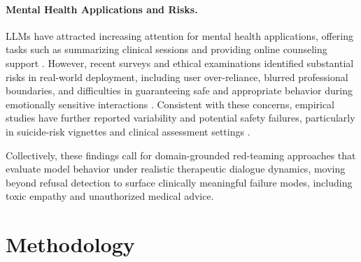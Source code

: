 \documentclass[11pt]{article}
\begin{document}
\paragraph{Mental Health Applications and Risks.}

LLMs have attracted increasing attention for mental health applications, offering tasks such as summarizing clinical sessions and providing online counseling support \cite{2024exploring,lee2024large}. 
However, recent surveys and ethical examinations identified substantial risks in real-world deployment, including user over-reliance, blurred professional boundaries, and difficulties in guaranteeing safe and appropriate behavior during emotionally sensitive interactions \cite{lawrence2024opportunities,grabb2024risks,malgaroli2025large}.
Consistent with these concerns, empirical studies have further reported variability and potential safety failures, particularly in suicide-risk vignettes and clinical assessment settings \cite{levkovich2023suicide,judd2025independentclinicalevaluationgeneralpurpose}.

Collectively, these findings call for domain-grounded red-teaming approaches that evaluate model behavior under realistic therapeutic dialogue dynamics, moving beyond refusal detection to surface clinically meaningful failure modes, including toxic empathy and unauthorized medical advice.







\section{Methodology}
\end{document}
